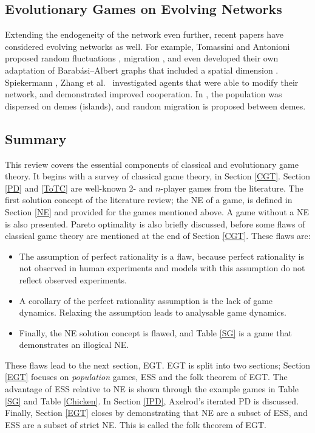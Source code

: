  \subsection{Evolutionary Games on Evolving Networks}
 Extending the endogeneity of the network even further, recent papers have considered evolving networks as well. For example, Tomassini and Antonioni proposed random fluctuations \cite{RN41,RN42}, migration \cite{RN50, RN62}, and even developed their own adaptation of Barab\'{a}si--Albert graphs that included a spatial dimension \cite{RN51}. Spiekermann \cite{RN68}, Zhang et al.~\cite{RN71} investigated agents that were able to modify their network, and demonstrated improved cooperation. In \cite{RN72}, the population was dispersed on demes (islands), and random migration is proposed between demes. \\
 
 






\subsection{Summary}
This review covers the essential components of classical and evolutionary game theory. It begins with a survey of classical game theory, in Section \ref{CGT}. Section \ref{PD} and \ref{ToTC} are well-known 2- and $n$-player games from the literature. The first solution concept of the literature review; the NE of a game, is defined in Section \ref{NE} and provided for the games mentioned above. A game without a NE is also presented. Pareto optimality is also briefly discussed, before some flaws of classical game theory are mentioned at the end of Section \ref{CGT}.  These flaws are:

\begin{itemize}
    \item The assumption of perfect rationality is a flaw, because perfect rationality is not observed in human experiments and models with this assumption do not reflect observed experiments. 
    \item A corollary of the perfect rationality assumption is the lack of game dynamics. Relaxing the assumption leads to analysable game dynamics.
    \item  Finally, the NE solution concept is flawed, and Table \ref{SG} is a game that demonstrates an illogical NE.
    
\end{itemize} 
These flaws lead to the next section, EGT. EGT is split into two sections; Section \ref{EGT} focuses on \emph{population} games, ESS and the folk theorem of EGT. The advantage of ESS relative to NE is shown through the example games in Table \ref{SG} and Table \ref{Chicken}. In Section \ref{IPD}, Axelrod's iterated PD is discussed. Finally, Section \ref{EGT} closes by demonstrating  that NE are a subset of ESS, and ESS are a subset of strict NE. This is called the folk theorem of EGT. \\

